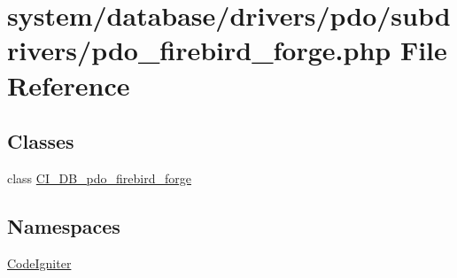 \hypertarget{pdo__firebird__forge_8php}{}\section{system/database/drivers/pdo/subdrivers/pdo\+\_\+firebird\+\_\+forge.php File Reference}
\label{pdo__firebird__forge_8php}
\subsection*{Classes}
\begin{DoxyCompactItemize}
\item 
class \mbox{\hyperlink{class_c_i___d_b__pdo__firebird__forge}{C\+I\+\_\+\+D\+B\+\_\+pdo\+\_\+firebird\+\_\+forge}}
\end{DoxyCompactItemize}
\subsection*{Namespaces}
\begin{DoxyCompactItemize}
\item 
 \mbox{\hyperlink{namespace_code_igniter}{Code\+Igniter}}
\end{DoxyCompactItemize}

